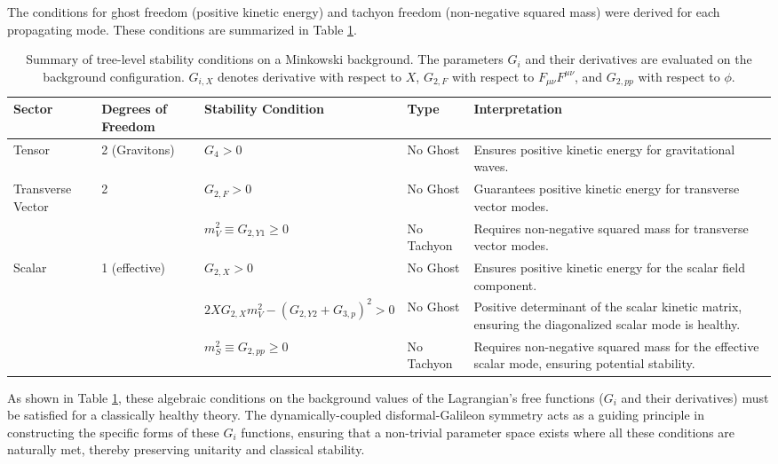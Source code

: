 \documentclass[twocolumn]{aastex631}
\begin{document}
The conditions for ghost freedom (positive kinetic energy) and tachyon freedom (non-negative squared mass) were derived for each propagating mode. These conditions are summarized in Table \ref{tab:stability_conditions}.

\begin{table}[ht!]
\caption{Summary of tree-level stability conditions on a Minkowski background. The parameters $G_i$ and their derivatives are evaluated on the background configuration. $G_{i,X}$ denotes derivative with respect to $X$, $G_{2,F}$ with respect to $F_{\mu\nu}F^{\mu\nu}$, and $G_{2,pp}$ with respect to $\phi$.}
\label{tab:stability_conditions}
\centering
\begin{tabular}{p{} p{} p{} p{} p{}}
\hline
\textbf{Sector} & \textbf{Degrees of Freedom} & \textbf{Stability Condition} & \textbf{Type} & \textbf{Interpretation} \\
\hline
Tensor & 2 (Gravitons) & $G_4 > 0$ & No Ghost & Ensures positive kinetic energy for gravitational waves. \\
Transverse Vector & 2 & $G_{2,F} > 0$ & No Ghost & Guarantees positive kinetic energy for transverse vector modes. \\
& & $m_V^2 \equiv G_{2,Y1} \ge 0$ & No Tachyon & Requires non-negative squared mass for transverse vector modes. \\
Scalar & 1 (effective) & $G_{2,X} > 0$ & No Ghost & Ensures positive kinetic energy for the scalar field component. \\
& & $2X G_{2,X} m_V^2 - (G_{2,Y2} + G_{3,p})^2 > 0$ & No Ghost & Positive determinant of the scalar kinetic matrix, ensuring the diagonalized scalar mode is healthy. \\
& & $m_S^2 \equiv G_{2,pp} \ge 0$ & No Tachyon & Requires non-negative squared mass for the effective scalar mode, ensuring potential stability. \\
\hline
\end{tabular}
\end{table}

As shown in Table \ref{tab:stability_conditions}, these algebraic conditions on the background values of the Lagrangian's free functions ($G_i$ and their derivatives) must be satisfied for a classically healthy theory. The dynamically-coupled disformal-Galileon symmetry acts as a guiding principle in constructing the specific forms of these $G_i$ functions, ensuring that a non-trivial parameter space exists where all these conditions are naturally met, thereby preserving unitarity and classical stability.
\end{document}
